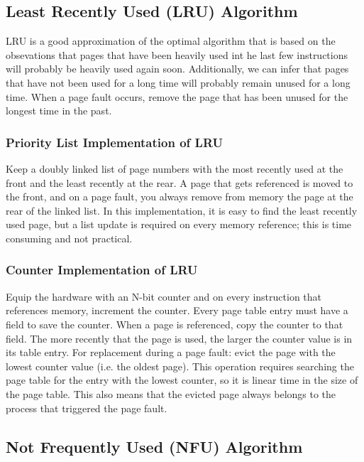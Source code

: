 \documentclass{article}
\begin{document}
\subsection{Least Recently Used (LRU) Algorithm}

LRU is a good approximation of the optimal algorithm that is based on the obsevations that pages that have been heavily used int he last few instructions will probably be heavily used again soon. Additionally, we can infer that pages that have not been used for a long time will probably remain unused for a long time. When a page fault occurs, remove the page that has been unused for the longest time in the past. 

\subsubsection{Priority List Implementation of LRU}

Keep a doubly linked list of page numbers with the most recently used at the front and the least recently at the rear. A page that gets referenced is moved to the front, and on a page fault, you always remove from memory the page at the rear of the linked list. In this implementation, it is easy to find the least recently used page, but a list update is required on every memory reference; this is time consuming and not practical. 

\subsubsection{Counter Implementation of LRU}

Equip the hardware with an N-bit counter and on every instruction that references memory, increment the counter. Every page table entry must have a field to save the counter. When a page is referenced, copy the counter to that field. The more recently that the page is used, the larger the counter value is in its table entry. For replacement during a page fault: evict the page with the lowest counter value (i.e. the oldest page). This operation requires searching the page table for the entry with the lowest counter, so it is linear time in the size of the page table. This also means that the evicted page always belongs to the process that triggered the page fault.

\subsection{Not Frequently Used (NFU) Algorithm}
\end{document}
